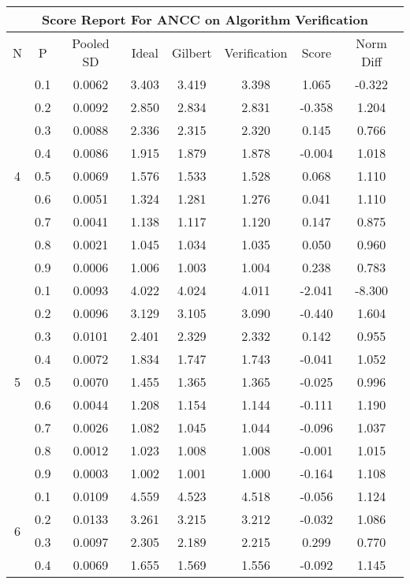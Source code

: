 \documentclass[11pt,a4paper]{report}
\begin{document}
\begin{longtable}{ | c | c || c | c | c | c | c | c | }
\hline
\multicolumn{8}{|c|}{ Score Report For ANCC on Algorithm Verification} \\
\hline
N & P & Pooled SD &  Ideal &  Gilbert & Verification  & Score & Norm Diff \\
 \hline
 \hline
 \endhead
\multirow{9}{*}{4} & 0.1 & 0.0062 & 3.403 & 3.419 & 3.398 & 1.065 & -0.322 \\
 & 0.2 & 0.0092 & 2.850 & 2.834 & 2.831 & -0.358 & 1.204 \\
 & 0.3 & 0.0088 & 2.336 & 2.315 & 2.320 & 0.145 & 0.766 \\
 & 0.4 & 0.0086 & 1.915 & 1.879 & 1.878 & -0.004 & 1.018 \\
 & 0.5 & 0.0069 & 1.576 & 1.533 & 1.528 & 0.068 & 1.110 \\
 & 0.6 & 0.0051 & 1.324 & 1.281 & 1.276 & 0.041 & 1.110 \\
 & 0.7 & 0.0041 & 1.138 & 1.117 & 1.120 & 0.147 & 0.875 \\
 & 0.8 & 0.0021 & 1.045 & 1.034 & 1.035 & 0.050 & 0.960 \\
 & 0.9 & 0.0006 & 1.006 & 1.003 & 1.004 & 0.238 & 0.783 \\
 \hline
\multirow{9}{*}{5} & 0.1 & 0.0093 & 4.022 & 4.024 & 4.011 & -2.041 & -8.300 \\
 & 0.2 & 0.0096 & 3.129 & 3.105 & 3.090 & -0.440 & 1.604 \\
 & 0.3 & 0.0101 & 2.401 & 2.329 & 2.332 & 0.142 & 0.955 \\
 & 0.4 & 0.0072 & 1.834 & 1.747 & 1.743 & -0.041 & 1.052 \\
 & 0.5 & 0.0070 & 1.455 & 1.365 & 1.365 & -0.025 & 0.996 \\
 & 0.6 & 0.0044 & 1.208 & 1.154 & 1.144 & -0.111 & 1.190 \\
 & 0.7 & 0.0026 & 1.082 & 1.045 & 1.044 & -0.096 & 1.037 \\
 & 0.8 & 0.0012 & 1.023 & 1.008 & 1.008 & -0.001 & 1.015 \\
 & 0.9 & 0.0003 & 1.002 & 1.001 & 1.000 & -0.164 & 1.108 \\
 \hline
\multirow{9}{*}{6} & 0.1 & 0.0109 & 4.559 & 4.523 & 4.518 & -0.056 & 1.124 \\
 & 0.2 & 0.0133 & 3.261 & 3.215 & 3.212 & -0.032 & 1.086 \\
 & 0.3 & 0.0097 & 2.305 & 2.189 & 2.215 & 0.299 & 0.770 \\
 & 0.4 & 0.0069 & 1.655 & 1.569 & 1.556 & -0.092 & 1.145 \\

\end{longtable}
\end{document}
